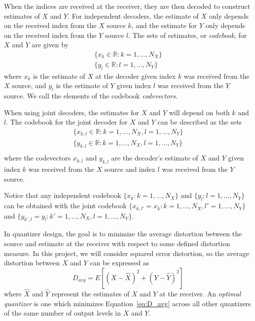 \documentclass[10pt]{article}
\newcommand{\real}{\mathbb{R}}
\begin{document}
When the indices are received at the receiver, they are then decoded to construct estimates of $X$ and $Y$. For independent decoders, the estimate of $X$ only depends on the received index from the $X$ source $k$, and the estimate for $Y$ only depends on the received index from the $Y$ source $l$. The sets of estimates, or \emph{codebook}, for $X$ and $Y$ are given by
\begin{gather*}
    \{x_k \in \real : k = 1,\ldots,N_X\} \\
    \{y_l \in \real : l = 1,\ldots,N_Y\}
\end{gather*}
where $x_k$ is the estimate of $X$ at the decoder given index $k$ was received from the $X$ source, and $y_l$ is the estimate of $Y$ given index $l$ was received from the $Y$ source. We call the elements of the codebook \emph{codevectors}.

When using joint decoders, the estimates for $X$ and $Y$ will depend on both $k$ and $l$. The codebook for the joint decoder for $X$ and $Y$ can be described as the sets
\begin{gather*}
    \{x_{k,l} \in \real : k = 1,\ldots,N_X, l = 1,\ldots,N_Y\} \\
    \{y_{k,l} \in \real : k = 1,\ldots,N_X, l = 1,\ldots,N_Y\} \\
\end{gather*}
where the codevectors $x_{k,l}$ and $y_{k,l}$ are the decoder's estimate of $X$ and $Y$ given index $k$ was received from the $X$ source and index $l$ was received from the $Y$ source.

Notice that any independent codebook $\{x_k : k = 1,\ldots,N_X\}$ and $\{y_l : l = 1,\ldots,N_Y\}$ can be obtained with the joint codebook $\{x_{k,l'}=x_k : k=1,\ldots,N_X, l'=1,\ldots,N_Y\}$ and $\{y_{k',l}=y_l : k'=1,\ldots,N_X, l=1,\ldots,N_Y\}$.

In quantizer design, the goal is to minimize the average distortion between the source and estimate at the receiver with respect to some defined distortion measure. In this project, we will consider squared error distortion, so the average distortion between $X$ and $Y$ can be expressed as
\begin{equation}
    \label{eq:D_avg}
    D_{avg} = E[{(X-\hat{X})}^2 + {(Y-\hat{Y})}^2]
\end{equation}
where $\hat{X}$ and $\hat{Y}$ represent the estimates of $X$ and $Y$ at the receiver. An \emph{optimal quantizer} is one which minimizes Equation~\ref{eq:D_avg} across all other quantizers of the same number of output levels in $X$ and $Y$.
\end{document}
